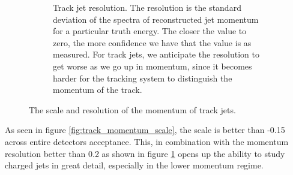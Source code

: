 \begin{figure}
\begin{subfigure}{0.4\textwidth}
        \caption{Track jet resolution.  The resolution is the standard deviation of the spectra of reconstructed jet momentum for a particular truth energy.  The closer the value to zero, the more confidence we have that the value is as measured.  For track jets, we anticipate the resolution to get worse as we go up in momentum, since it becomes harder for the tracking system to distinguish the momentum of the track.}
        \label{fig:track_momentum_resolution}
    \end{subfigure}
    \caption{The scale and resolution of the momentum of track jets.}
    \label{fig:track_momentum_reso_scale}
\end{figure}

As seen in figure \ref{fig:track_momentum_scale}, the scale is better than -0.15 across entire detectors acceptance.  This, in combination with the momentum resolution better than 0.2 as shown in figure \ref{fig:track_momentum_resolution} opens up the ability to study charged jets in great detail, especially in the lower momentum regime.  

